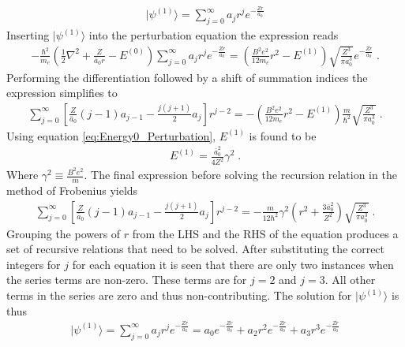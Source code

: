         \begin{align}
            \vert \psi^{(1)} \rangle = \sum_{j = 0}^\infty a_j r^j e^{-\frac{Zr}{a_0}}
        \end{align}
        \noindent Inserting $\vert \psi^{(1)} \rangle$ into the perturbation equation the expression reads 
        \begin{align}
            -\frac{\hbar^2}{m_e} \left(\frac{1}{2} \nabla^2 + \frac{Z}{\bar{a}_0 r} - E^{(0)} \right) \sum_{j = 0}^\infty a_j r^j e^{-\frac{Zr}{a_0}} = \left(\frac{B^2e^2}{12m_e}r^2 - E^{(1)} \right) \sqrt{\frac{Z^3}{\pi a_0^3}}e^{-\frac{Zr}{a_0}}\;.
        \end{align}
        \noindent Performing the differentiation followed by a shift of summation indices the expression simplifies to
        \begin{align}
            \sum_{j = 0}^\infty \left[ \frac{Z}{\bar{a}_0}(j - 1)a_{j-1} - \frac{j(j+1)}{2}a_j \right]r^{j-2} = -\left(\frac{B^2e^2}{12m_e}r^2 - E^{(1)} \right) \frac{m}{\hbar^2}\sqrt{\frac{Z^3}{\pi a_0^3}}\;.\label{eq:Result_r^2_sum}
        \end{align}
        \noindent Using equation \eqref{eq:Energy0_Perturbation}, $E^{(1)}$ is found to be 
        \begin{align}
            E^{(1)} = \frac{\bar{a}_0^2}{4Z^2} \gamma^2\;.
        \end{align}
        \noindent Where $\gamma^2 \equiv \frac{B^2 e^2}{m}$. The final expression before solving the recursion relation in the method of Frobenius yields 
        \begin{align}
            \sum_{j = 0}^\infty \left[ \frac{Z}{\bar{a}_0}(j - 1)a_{j-1} - \frac{j(j+1)}{2}a_j \right]r^{j-2} = -\frac{m}{12\hbar^2} \gamma^2 \left(r^2 + \frac{3\bar{a}_0^2}{Z^2} \right) \sqrt{\frac{Z^3}{\pi a_0^3}}\;.
        \end{align}
        Grouping the powers of $r$ from the LHS and the RHS of the equation produces a set of recursive relations that need to be solved. After substituting the correct integers for $j$ for each equation it is seen that there are only two instances when the series terms are non-zero. These terms are for $j = 2$ and $j = 3$. All other terms in the series are zero and thus non-contributing. The solution for $\vert \psi^{(1)} \rangle$ is thus 
        \begin{align}
            \vert \psi^{(1)} \rangle = \sum_{j = 0}^\infty a_j r^j e^{-\frac{Zr}{a_0}} = a_0 e^{-\frac{Zr}{a_0}} + a_2 r^2 e^{-\frac{Zr}{a_0}} + a_3 r^3 e^{-\frac{Zr}{a_0}}
        \end{align}
